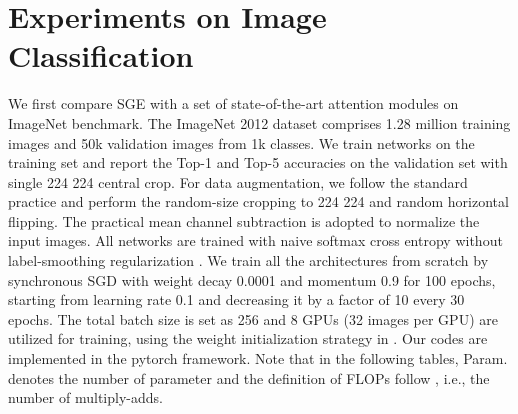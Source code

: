 \documentclass{article}
\begin{document}
	\section{Experiments on Image Classification}
We first compare SGE with a set of state-of-the-art attention modules on ImageNet benchmark. The ImageNet 2012 dataset \cite{russakovsky2015imagenet} comprises 1.28 million training images and 50k validation images from 1k classes. We train networks on the training set and report the Top-1 and Top-5 accuracies on the validation set with single 224  224 central crop. For data augmentation, we follow the standard practice \cite{szegedy2015going} and perform the random-size cropping to 224  224 and random horizontal flipping. The practical mean channel subtraction is adopted to normalize the input images. All networks are trained with naive softmax cross entropy without label-smoothing regularization \cite{szegedy2016rethinking}. We train all the architectures from scratch by synchronous SGD with weight decay 0.0001 and momentum 0.9 for 100 epochs, starting from learning rate 0.1 and decreasing it by a factor of 10 every 30 epochs. The total batch size is set as 256 and 8 GPUs (32 images per GPU) are utilized for training, using the weight initialization strategy in \cite{he2015delving}. Our codes are implemented in the pytorch \cite{paszke2017pytorch} framework. Note that in the following tables, Param. denotes the number of parameter and the definition of FLOPs follow  \cite{zhang1707shufflenet}, i.e., the number of multiply-adds.
	
\end{document}
